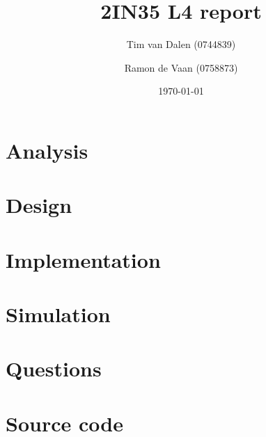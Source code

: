 \documentclass[a4paper,11pt]{article}
\title{
	2IN35 L4 report
}
\author{
	Tim van Dalen (0744839)
	\and
	Ramon de Vaan (0758873)
}
\date{\today}
\begin{document}
	\maketitle

	\section{Analysis}
	

	\section{Design}
	

	\section{Implementation}
	

	\section{Simulation}
	

	\section{Questions}
	

	\appendix
	\section{Source code}
	
\end{document}
